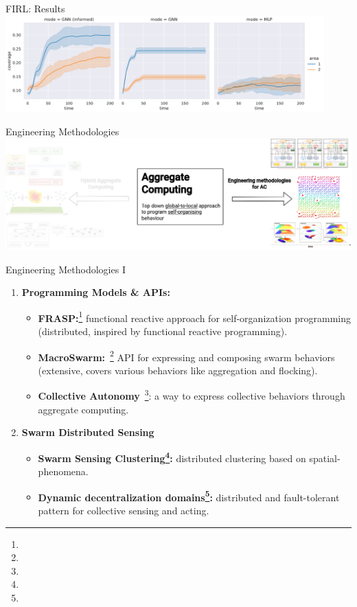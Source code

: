 \documentclass[presentation, 8pt,169]{beamer}\mode<presentation>{\usetheme{AMSBolognaFC}}
\begin{document}
\begin{frame}[allowframebreaks]{FIRL: Results}
\includegraphics[width=0.92\textwidth]{img/coverage-two-test.pdf}

\end{frame}
\begin{frame}{Engineering Methodologies}
  \includegraphics[width=\textwidth]{img/eng-part.drawio.png}
\end{frame}
\begin{frame}[fragile]{Engineering Methodologies I}

  \begin{enumerate}
  \item \textbf{Programming Models \& APIs:}
  
  \begin{itemize}
  \item \textbf{FRASP:}\footnote{} functional reactive approach for self-organization programming (distributed, inspired by functional reactive programming).
  \item \textbf{MacroSwarm:}~\footnote{} API for expressing and composing swarm behaviors (extensive, covers various behaviors like aggregation and flocking).
  \item \textbf{Collective Autonomy}~\footnote{}: a way to express collective behaviors through aggregate computing.
  \end{itemize}
  
  \item \textbf{Swarm Distributed Sensing}
  
  \begin{itemize}
  \item \textbf{Swarm Sensing Clustering\footnote{}:} distributed clustering based on spatial-phenomena.
  \item \textbf{Dynamic decentralization domains\footnote{}:} distributed and fault-tolerant pattern for collective sensing and acting.
  \end{itemize}
\end{enumerate}

\end{frame}
\end{document}
